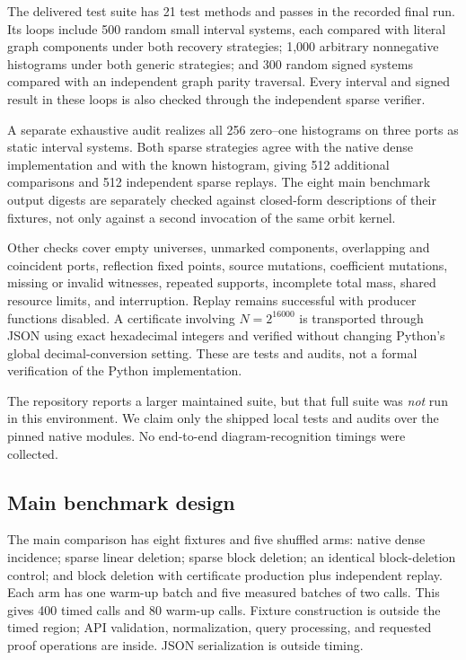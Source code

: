 \documentclass[11pt,letterpaper]{article}
\theoremstyle{definition}\newtheorem{definition}[theorem]{Definition}
\theoremstyle{remark}\newtheorem{remark}[theorem]{Remark}
\begin{document}
The delivered test suite has 21 test methods and passes in the recorded final run. Its loops include 500 random small interval systems, each compared with literal graph components under both recovery strategies; 1,000 arbitrary nonnegative histograms under both generic strategies; and 300 random signed systems compared with an independent graph parity traversal. Every interval and signed result in these loops is also checked through the independent sparse verifier.

A separate exhaustive audit realizes all 256 zero--one histograms on three ports as static interval systems. Both sparse strategies agree with the native dense implementation and with the known histogram, giving 512 additional comparisons and 512 independent sparse replays. The eight main benchmark output digests are separately checked against closed-form descriptions of their fixtures, not only against a second invocation of the same orbit kernel.

Other checks cover empty universes, unmarked components, overlapping and coincident ports, reflection fixed points, source mutations, coefficient mutations, missing or invalid witnesses, repeated supports, incomplete total mass, shared resource limits, and interruption. Replay remains successful with producer functions disabled. A certificate involving $N=2^{16000}$ is transported through JSON using exact hexadecimal integers and verified without changing Python's global decimal-conversion setting. These are tests and audits, not a formal verification of the Python implementation.

The repository reports a larger maintained suite, but that full suite was \emph{not} run in this environment. We claim only the shipped local tests and audits over the pinned native modules. No end-to-end diagram-recognition timings were collected.

\subsection{Main benchmark design}

The main comparison has eight fixtures and five shuffled arms: native dense incidence; sparse linear deletion; sparse block deletion; an identical block-deletion control; and block deletion with certificate production plus independent replay. Each arm has one warm-up batch and five measured batches of two calls. This gives 400 timed calls and 80 warm-up calls. Fixture construction is outside the timed region; API validation, normalization, query processing, and requested proof operations are inside. JSON serialization is outside timing.
\end{document}
